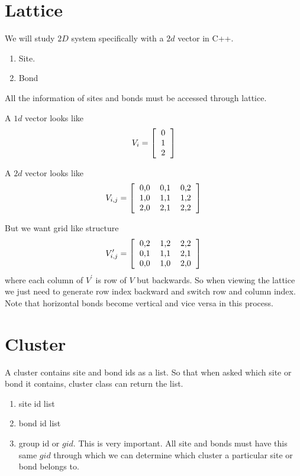 \documentclass[10pt,a4paper]{report}
\begin{document}
	\section{Lattice}
	We will study $2D$ system specifically with a $2d$ vector in C++.
	\begin{enumerate}
		\item Site.
		\item Bond
	\end{enumerate}
 All the information of sites and bonds must be accessed through lattice.
	
	A $1d$ vector looks like
	\begin{equation*}
	V_i = 
	\left[
	\begin{tabular}{c}
		0 \\ 1 \\ 2
	\end{tabular}
	\right]
	\end{equation*}
	
		A $2d$ vector looks like
	\begin{equation*}
	V_{i,j} = 
	\left[
	\begin{tabular}{cccc}
	0,0 & 0,1 & 0,2 \\
	1,0 & 1,1 & 1,2 \\
	2,0 & 2,1 & 2,2
	\end{tabular}
	\right]
	\end{equation*}
	
	But we want grid like structure 
	\begin{equation*}
	V^\prime_{i,j} = 
	\left[
	\begin{tabular}{cccc}
	0,2 & 1,2 & 2,2 \\
	0,1 & 1,1 & 2,1 \\
	0,0 & 1,0 & 2,0
	\end{tabular}
	\right]
	\end{equation*}
	where each column of $V^\prime$ is row of $V$ but backwards. So when viewing the lattice we just need to generate row index backward and  switch row and column index. Note that horizontal bonds become vertical and vice versa in this process.

	\section{Cluster}
	A cluster contains site and bond ids as a list. So that when asked which site or bond it contains, cluster class can return the list.
	\begin{enumerate}
		\item site id list
		\item bond id list
		\item group id or $gid$. This is very important. All site and bonds must have this same $gid$ through which we can determine which cluster a particular site or bond belongs to.
	\end{enumerate}
\end{document}
